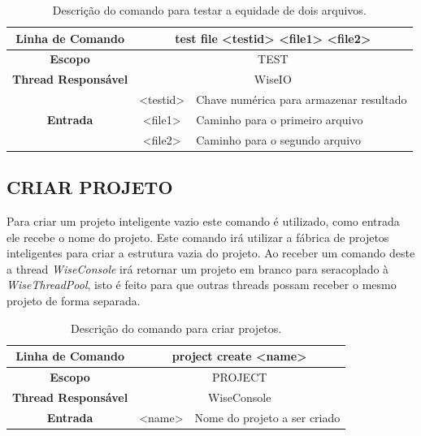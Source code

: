 \begin{center}
	\begin{table}[!htbp]
		\begin{tabular}{|c|c|m{}|}
			\hline
			\textbf{Linha de Comando} & \multicolumn{2}{c|}{test file <test\underline{\space\space}id> <file1> <file2>} \\
			\hline
			\textbf{Escopo} & \multicolumn{2}{c|}{TEST} \\
			\hline
			\textbf{Thread Responsável} & \multicolumn{2}{c|}{WiseIO} \\
			\hline
			\multirow{3}{*}{\textbf{Entrada}} & <test\underline{\space\space}id> & Chave numérica para armazenar resultado \\
			& <file1> & Caminho para o primeiro arquivo \\
			& <file2> & Caminho para o segundo arquivo \\
			\hline
		\end{tabular}
		\caption{Descrição do comando para testar a equidade de dois arquivos.}
		\label{tab:file_test}
	\end{table}
\end{center}

\subsection{CRIAR PROJETO}\label{sec:create_projects}

Para criar um projeto inteligente vazio este comando é utilizado, como entrada ele recebe o nome do projeto. Este comando irá utilizar a fábrica de projetos inteligentes para criar a estrutura vazia do projeto. Ao receber um comando deste a thread \textit{WiseConsole} irá retornar um projeto em branco para seracoplado à \textit{WiseThreadPool}, isto é feito para que outras threads possam receber o mesmo projeto de forma separada.

\begin{center}
	\begin{table}[!htbp]
		\begin{tabular}{|c|c|m{}|}
			\hline
			\textbf{Linha de Comando} & \multicolumn{2}{c|}{project create <name>} \\
			\hline
			\textbf{Escopo} & \multicolumn{2}{c|}{PROJECT} \\
			\hline
			\textbf{Thread Responsável} & \multicolumn{2}{c|}{WiseConsole} \\
			\hline
			\textbf{Entrada} & <name> & Nome do projeto a ser criado \\
			\hline
		\end{tabular}
		\caption{Descrição do comando para criar projetos.}
		\label{tab:create_project}
	\end{table}
\end{center}

